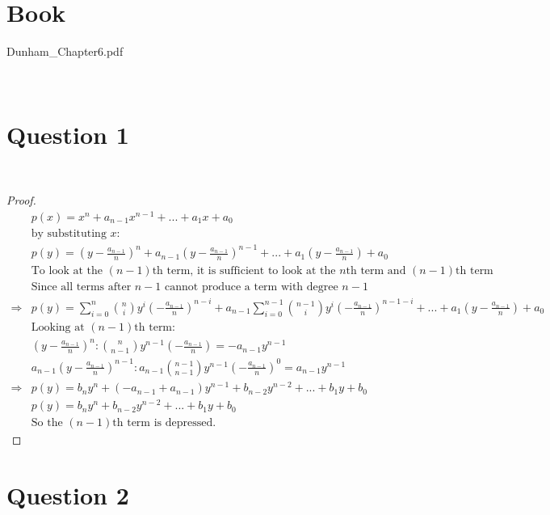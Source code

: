 \documentclass{article}
\begin{document}
\section*{Book}

Dunham\_Chapter6.pdf

~

\section*{Question 1}

~

\begin{proof}
    \begin{align*}
        &p(x)=x^n+a_{n-1}x^{n-1}+...+a_1x+a_0\\
        &\text{by substituting }x:\\
        &p(y)=(y-\frac{a_{n-1}}{n})^n+a_{n-1}(y-\frac{a_{n-1}}{n})^{n-1}+...+a_1(y-\frac{a_{n-1}}{n})+a_0\\
        &\text{To look at the }(n-1)\text{th term, it is sufficient to look at the }n\text{th term and }(n-1)\text{th term}\\
        &\text{Since all terms after }n-1\text{ cannot produce a term with degree }n-1\\
        \Rightarrow&p(y)=\sum_{i=0}^{n}\binom{n}{i}y^i(-\frac{a_{n-1}}{n})^{n-i}+a_{n-1}\sum_{i=0}^{n-1}\binom{n-1}{i}y^i(-\frac{a_{n-1}}{n})^{n-1-i}+...+a_1(y-\frac{a_{n-1}}{n})+a_0\\
        &\text{Looking at }(n-1)\text{th term}:\\
        &(y-\frac{a_{n-1}}{n})^n:\binom{n}{n-1}y^{n-1}(-\frac{a_{n-1}}{n})=-a_{n-1}y^{n-1}\\
        &a_{n-1}(y-\frac{a_{n-1}}{n})^{n-1}:a_{n-1}\binom{n-1}{n-1}y^{n-1}(-\frac{a_{n-1}}{n})^0=a_{n-1}y^{n-1}\\
        \Rightarrow&p(y)=b_ny^n+(-a_{n-1}+a_{n-1})y^{n-1}+b_{n-2}y^{n-2}+...+b_1y+b_0\\
        &p(y)=b_ny^n+b_{n-2}y^{n-2}+...+b_1y+b_0\\
        &\text{So the }(n-1)\text{th term is depressed}.
    \end{align*}
\end{proof}

\newpage

\section*{Question 2}
\end{document}
